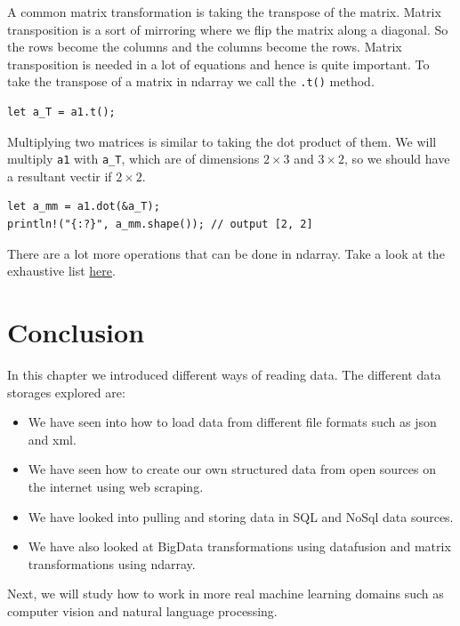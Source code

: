 \documentclass{book}
\begin{document}
A common matrix transformation is taking the transpose of the matrix. Matrix transposition is a sort of mirroring where we flip the matrix along a diagonal. So the rows become the columns and the columns become the rows. Matrix transposition is needed in a lot of equations and hence is quite important. To take the transpose of a matrix in ndarray we call the \lstinline{.t()} method.

\begin{lstlisting}[caption={},basicstyle=\small]
let a_T = a1.t();
\end{lstlisting}

Multiplying two matrices is similar to taking the dot product of them. We will multiply \lstinline{a1} with \lstinline{a_T}, which are of dimensions $2 \times 3$ and $3 \times 2$, so we should have a resultant vectir if $2 \times 2$.

\begin{lstlisting}[caption={},basicstyle=\small]
let a_mm = a1.dot(&a_T);
println!("{:?}", a_mm.shape()); // output [2, 2]
\end{lstlisting}

There are a lot more operations that can be done in ndarray. Take a look at the exhaustive list \href{https://docs.rs/ndarray/0.11/ndarray/doc/ndarray_for_numpy_users/index.html}{here}.

\label{sec:ndarray}

\section{Conclusion}%
In this chapter we introduced different ways of reading data. The different data storages explored are:

\begin{itemize}
	\item We have seen into how to load data from different file formats such as json and xml.
	\item We have seen how to create our own structured data from open sources on the internet using web scraping.
	\item We have looked into pulling and storing data in SQL and NoSql data sources.
	\item We have also looked at BigData transformations using datafusion and matrix transformations using ndarray.
\end{itemize}

Next, we will study how to work in more real machine learning domains such as computer vision and natural language processing.
\label{sec:conclusion}

\printbibliography
\nocite{*}
\end{document}
